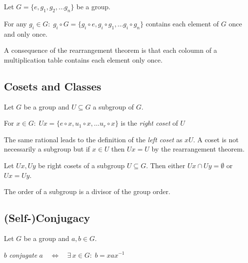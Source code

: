 \begin{thm}\label{thm:11_rearrangement}
Let $G = \lbrace e, g_1, g_2, \dots g_n \rbrace$ be a group. \par
\noindent For any $g_i \in G: \; g_i \circ G = \lbrace g_i \circ e, g_i \circ g_1, \dots g_i \circ g_n \rbrace$ contains each element of $G$ once and only once.
\end{thm}

A consequence of the rearrangement theorem is that each coloumn of a multiplication table contains each element only once.

\subsection{Cosets and Classes}

\begin{dfn}[Coset]\label{dfn:14_coset}
Let $G$ be a group and $U \subseteq G$ a subgroup of $G$. \par
\noindent For $x \in G: \; Ux = \lbrace e\circ x, u_1\circ x, \dots u_r \circ x \rbrace$ is the \textit{right coset} of $U$
\end{dfn}

The same rational leads to the definition of the \textit{left coset} as $xU$. A coset is not necessarily a subgroup but if $x \in U$ then $Ux = U$ by the rearrangement theorem. 

\begin{thm}\label{thm:12_cosets-dist}
Let $Ux, Uy$ be right cosets of a subgroup $U \subseteq G$. Then either $Ux \cap Uy = \emptyset$ or $Ux = Uy$. 
\end{thm}

\begin{thm}\label{thm:13_order-div}
The order of a subgroup is a divisor of the group order. 
\end{thm}

\subsection{(Self-)Conjugacy}

\begin{dfn}[Conjugate]\label{dfn:15_conjugate}
Let $G$ be a group and $a,b \in G$. \par 
\noindent $b$ \textit{conjugate} $a \quad \Leftrightarrow \quad \exists \, x \in G: \; b = xax^{-1}$ 
\end{dfn}

